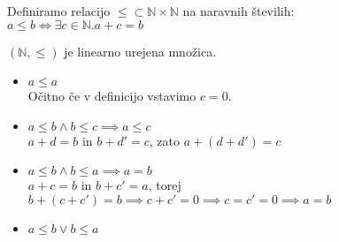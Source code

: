 \begin{definicija}
    Definiramo relacijo $\leq \subset \mathbb{N} \times \mathbb{N}$ na naravnih številih: \\
    $a \leq b \iff \exists c \in \mathbb{N}. a + c = b$
\end{definicija}

\begin{trditev}
    $(\mathbb{N}, \leq)$ je linearno urejena množica.
\end{trditev}
\begin{dokaz}
    \begin{itemize}
        \item $a \leq a$ \\
        Očitno če v definicijo vstavimo $c = 0$.
        \item $a \leq b \wedge b \leq c \implies a \leq c$ \\
        $a + d = b$ in $b + d' = c$, zato $a + (d + d') = c$
        \item $a \leq b \wedge b \leq a \implies a = b$ \\
        $a + c = b$ in $b + c' = a$, torej $b + (c + c') = b \implies c + c' = 0 \implies c = c' = 0 \implies a = b$
        \item $a \leq b \vee b \leq a$ \\

    \end{itemize}
\end{dokaz}


